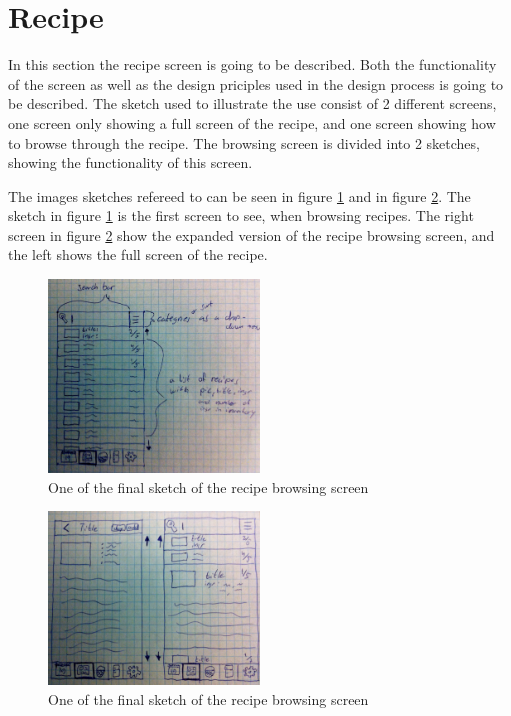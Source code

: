 \section{Recipe}

In this section the recipe screen is going to be described. Both the functionality of the screen as well as the design priciples used in the design process is going to be described. The sketch used to illustrate the use consist of 2 different screens, one screen only showing a full screen of the recipe, and one screen showing how to browse through the recipe. The browsing screen is divided into 2 sketches, showing the functionality of this screen.

The images sketches refereed to can be seen in figure \ref{FinalRecipeBrowsingSketch1} and in figure \ref{FinalRecipeBrowsingSketch2}. The sketch in figure \ref{FinalRecipeBrowsingSketch1} is the first screen to see, when browsing recipes. The right screen in figure \ref{FinalRecipeBrowsingSketch2} show the expanded version of the recipe browsing screen, and the left shows the full screen of the recipe.

\begin{figure}[H]
    \centering
    \includegraphics[width=0.5\textwidth]{Grafik/FoodPlanner/FinalRecipeBrowsingSketch1}
    \caption{One of the final sketch of the recipe browsing screen}
    \label{FinalRecipeBrowsingSketch1}
\end{figure}

\begin{figure}[H]
    \centering
    \includegraphics[width=0.5\textwidth]{Grafik/FoodPlanner/FinalRecipeBrowsingSketch2}
    \caption{One of the final sketch of the recipe browsing screen}
    \label{FinalRecipeBrowsingSketch2}
\end{figure}

